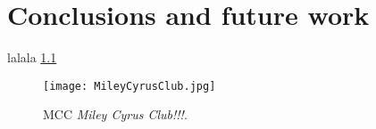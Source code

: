 
\chapter{Conclusions and future work}
\label{ch:conclusions}

lalala \ref{fig:MCC}

\begin{figure}[H]
	\centering
 	\texttt{[image: MileyCyrusClub.jpg]}
 	\caption{MCC \textit{Miley Cyrus Club!!!}.}
 	\label{fig:MCC}
\end{figure}

